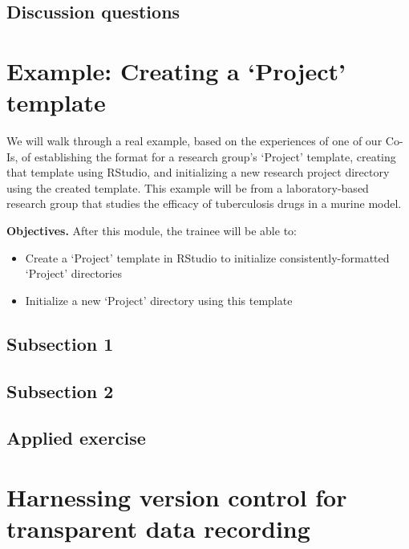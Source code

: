 \documentclass[]{tufte-book}
\providecommand{\tightlist}{%
  \setlength{\itemsep}{0pt}\setlength{\parskip}{0pt}}
\begin{document}
\hypertarget{discussion-questions-2}{%
\subsection{Discussion questions}\label{discussion-questions-2}}

\hypertarget{module8}{%
\section{Example: Creating a `Project' template}\label{module8}}

We will walk through a real example, based on the experiences of one of our
Co-Is, of establishing the format for a research group's `Project' template,
creating that template using RStudio, and initializing a new research project
directory using the created template. This example will be from a
laboratory-based research group that studies the efficacy of tuberculosis drugs
in a murine model.

\textbf{Objectives.} After this module, the trainee will be able to:

\begin{itemize}
\tightlist
\item
  Create a `Project' template in RStudio to initialize consistently-formatted
  `Project' directories
\item
  Initialize a new `Project' directory using this template
\end{itemize}

\hypertarget{subsection-1-2}{%
\subsection{Subsection 1}\label{subsection-1-2}}

\hypertarget{subsection-2-1}{%
\subsection{Subsection 2}\label{subsection-2-1}}

\hypertarget{applied-exercise-2}{%
\subsection{Applied exercise}\label{applied-exercise-2}}

\hypertarget{module9}{%
\section{Harnessing version control for transparent data recording}\label{module9}}
\end{document}
